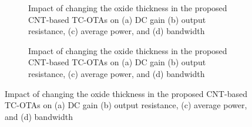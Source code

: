 
\begin{figure}[htbp]
  \centering
  \begin{subfigure}[b]{0.48\linewidth}
    \centering
    \caption{Impact of changing the oxide thickness in the proposed CNT-based TC-OTAs on (a) DC gain (b) output resistance, (c) average power, and (d) bandwidth}

  \end{subfigure}
  \hfill
  \begin{subfigure}[b]{0.48\linewidth}
    \centering
    \caption{Impact of changing the oxide thickness in the proposed CNT-based TC-OTAs on (a) DC gain (b) output resistance, (c) average power, and (d) bandwidth}

  \end{subfigure}
  \caption{Impact of changing the oxide thickness in the proposed CNT-based TC-OTAs on (a) DC gain (b) output resistance, (c) average power, and (d) bandwidth}

  \label{fig:group_jnhxf}
\end{figure}
